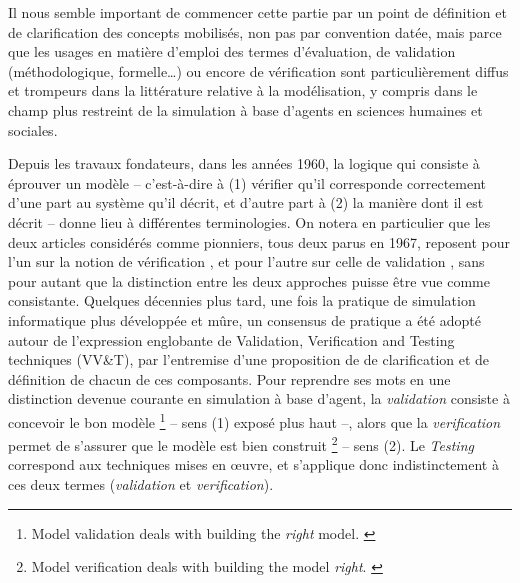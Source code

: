 Il nous semble important de commencer cette partie par un point de définition et de clarification des concepts mobilisés, non pas par convention datée, mais parce que les usages en matière d'emploi des termes d'évaluation, de validation (méthodologique, formelle\ldots) ou encore de vérification sont particulièrement diffus et trompeurs dans la littérature relative à la modélisation, y compris dans le champ plus restreint de la simulation à base d'agents en sciences humaines et sociales.

Depuis les travaux fondateurs, dans les années 1960, la logique qui consiste à éprouver un modèle -- c'est-à-dire à (1) vérifier qu'il corresponde correctement d'une part au système qu'il décrit, et d'autre part à (2) la manière dont il est décrit -- donne lieu à différentes terminologies.
On notera en particulier que les deux articles considérés comme pionniers, tous deux parus en 1967, reposent pour l'un sur la notion de vérification \autocite{naylor_verification_1967}, et pour l'autre sur celle de validation \autocite{hermann_validation_1967}, sans pour autant que la distinction entre les deux approches puisse être vue comme consistante.
Quelques décennies plus tard, une fois la pratique de simulation informatique plus développée et mûre, un consensus de pratique a été adopté autour de l'expression englobante de \og Validation, Verification and Testing techniques (VV\&T)\fg{}, par l'entremise d'une proposition de \textcite{balci_validation_1994} de clarification et de définition de chacun de ces composants.
Pour reprendre ses mots en une distinction devenue courante en simulation à base d'agent, la \textit{validation} consiste à concevoir le bon modèle 
\footnote{
	\og Model validation deals with building the \textit{right} model.\fg{} \autocite[121]{balci_validation_1994}
} -- sens (1) exposé plus haut --,
alors que la \textit{verification} permet de s'assurer que le modèle est bien construit
\footnote{
	\og Model verification deals with building the model \textit{right}.\fg{} \autocite[123]{balci_validation_1994}
} -- sens (2).
Le \og \textit{Testing}\fg{} correspond aux techniques mises en œuvre, et s'applique donc indistinctement à ces deux termes (\textit{validation} et \textit{verification}).

